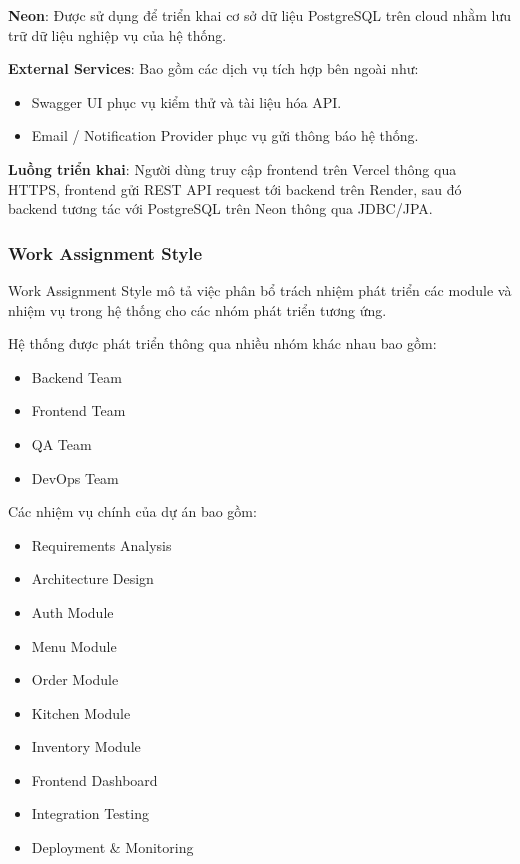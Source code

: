 \textbf{Neon}:  
Được sử dụng để triển khai cơ sở dữ liệu PostgreSQL trên cloud nhằm lưu trữ dữ liệu nghiệp vụ của hệ thống.

\textbf{External Services}:  
Bao gồm các dịch vụ tích hợp bên ngoài như:
\begin{itemize}
    \item Swagger UI phục vụ kiểm thử và tài liệu hóa API.
    \item Email / Notification Provider phục vụ gửi thông báo hệ thống.
\end{itemize}

\textbf{Luồng triển khai}:  
Người dùng truy cập frontend trên Vercel thông qua HTTPS, frontend gửi REST API request tới backend trên Render, sau đó backend tương tác với PostgreSQL trên Neon thông qua JDBC/JPA.

\vspace{0.5cm}

\subsubsection{Work Assignment Style}


Work Assignment Style mô tả việc phân bổ trách nhiệm phát triển các module và nhiệm vụ trong hệ thống cho các nhóm phát triển tương ứng.

Hệ thống được phát triển thông qua nhiều nhóm khác nhau bao gồm:
\begin{itemize}
    \item Backend Team
    \item Frontend Team
    \item QA Team
    \item DevOps Team
\end{itemize}

Các nhiệm vụ chính của dự án bao gồm:
\begin{itemize}
    \item Requirements Analysis
    \item Architecture Design
    \item Auth Module
    \item Menu Module
    \item Order Module
    \item Kitchen Module
    \item Inventory Module
    \item Frontend Dashboard
    \item Integration Testing
    \item Deployment \& Monitoring
\end{itemize}

